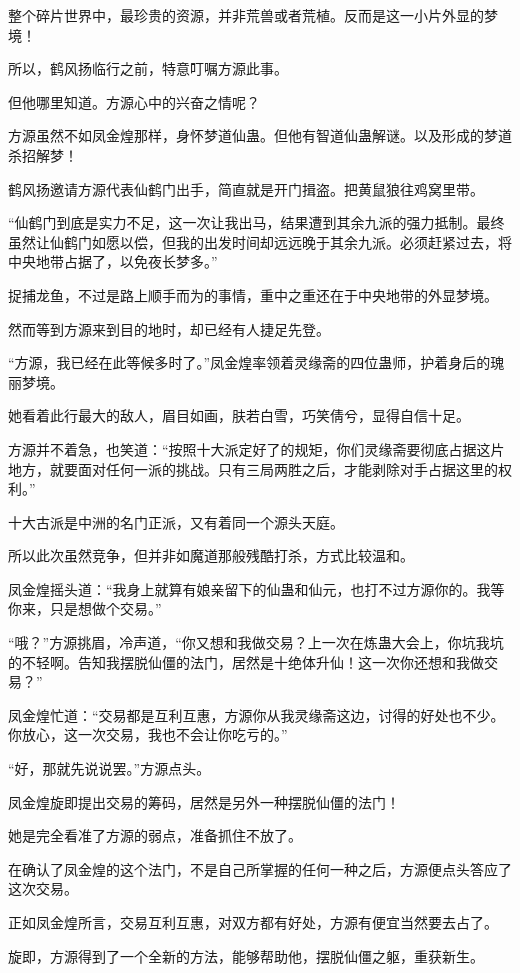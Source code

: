 \begin{this_body}
整个碎片世界中，最珍贵的资源，并非荒兽或者荒植。反而是这一小片外显的梦境！

所以，鹤风扬临行之前，特意叮嘱方源此事。

但他哪里知道。方源心中的兴奋之情呢？

方源虽然不如凤金煌那样，身怀梦道仙蛊。但他有智道仙蛊解谜。以及形成的梦道杀招解梦！

鹤风扬邀请方源代表仙鹤门出手，简直就是开门揖盗。把黄鼠狼往鸡窝里带。

“仙鹤门到底是实力不足，这一次让我出马，结果遭到其余九派的强力抵制。最终虽然让仙鹤门如愿以偿，但我的出发时间却远远晚于其余九派。必须赶紧过去，将中央地带占据了，以免夜长梦多。”

捉捕龙鱼，不过是路上顺手而为的事情，重中之重还在于中央地带的外显梦境。

然而等到方源来到目的地时，却已经有人捷足先登。

“方源，我已经在此等候多时了。”凤金煌率领着灵缘斋的四位蛊师，护着身后的瑰丽梦境。

她看着此行最大的敌人，眉目如画，肤若白雪，巧笑倩兮，显得自信十足。

方源并不着急，也笑道：“按照十大派定好了的规矩，你们灵缘斋要彻底占据这片地方，就要面对任何一派的挑战。只有三局两胜之后，才能剥除对手占据这里的权利。”

十大古派是中洲的名门正派，又有着同一个源头天庭。

所以此次虽然竞争，但并非如魔道那般残酷打杀，方式比较温和。

凤金煌摇头道：“我身上就算有娘亲留下的仙蛊和仙元，也打不过方源你的。我等你来，只是想做个交易。”

“哦？”方源挑眉，冷声道，“你又想和我做交易？上一次在炼蛊大会上，你坑我坑的不轻啊。告知我摆脱仙僵的法门，居然是十绝体升仙！这一次你还想和我做交易？”

凤金煌忙道：“交易都是互利互惠，方源你从我灵缘斋这边，讨得的好处也不少。你放心，这一次交易，我也不会让你吃亏的。”

“好，那就先说说罢。”方源点头。

凤金煌旋即提出交易的筹码，居然是另外一种摆脱仙僵的法门！

她是完全看准了方源的弱点，准备抓住不放了。

在确认了凤金煌的这个法门，不是自己所掌握的任何一种之后，方源便点头答应了这次交易。

正如凤金煌所言，交易互利互惠，对双方都有好处，方源有便宜当然要去占了。

旋即，方源得到了一个全新的方法，能够帮助他，摆脱仙僵之躯，重获新生。


\end{this_body}
